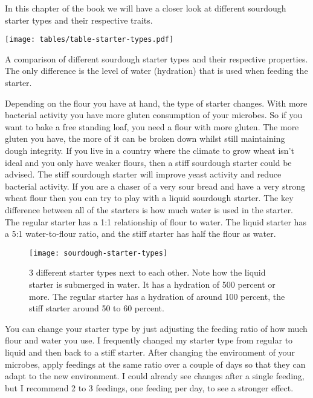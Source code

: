 In this chapter of the book we will have a closer look
at different sourdough starter types and their respective
traits.

\begin{table}[htp!]
  \texttt{[image: tables/table-starter-types.pdf]}
  \caption{A comparison of different sourdough starter types and their
  respective properties. The only difference is the level of water (hydration)
  that is used when feeding the starter.}
  \label{tab:starter-types-comparison}
\end{table}

Depending on the flour you have at hand, the type of starter changes. With more
bacterial activity you have more gluten consumption of your microbes. So if
you want to bake a free standing loaf, you need a flour with more gluten. The
more gluten you have, the more of it can be broken down whilst still maintaining
dough integrity. If you live in a country where the climate to grow wheat
isn't ideal and you only have weaker flours, then a stiff sourdough starter
could be advised. The stiff sourdough starter will improve yeast activity and
reduce bacterial activity. If you are a chaser of a very sour bread and have a
very strong wheat flour then you can try to play with a liquid sourdough
starter. The key difference between all of the starters is how much water
is used in the starter. The regular starter has a 1:1 relationship of flour
to water. The liquid starter has a 5:1 water-to-flour ratio, and the stiff
starter has half the flour as water.

\begin{figure}[!htb]
  \texttt{[image: sourdough-starter-types]}
  \caption{3 different starter types next to each other. Note how the liquid starter is submerged
  in water. It has a hydration of 500 percent or more.
  The regular starter has a hydration of around 100 percent, the stiff starter around 50 to 60 percent.}
  \label{fig:starter-types}
\end{figure}


You can change your starter type by just adjusting the feeding ratio of how
much flour and water you use. I frequently changed my starter type from
regular to liquid and then back to a stiff starter. After changing the
environment of your microbes, apply feedings at the same ratio over a couple of
days so that they can adapt to the new environment. I could already see
changes after a single feeding, but I recommend 2 to 3 feedings, one feeding per
day, to see a stronger effect.

